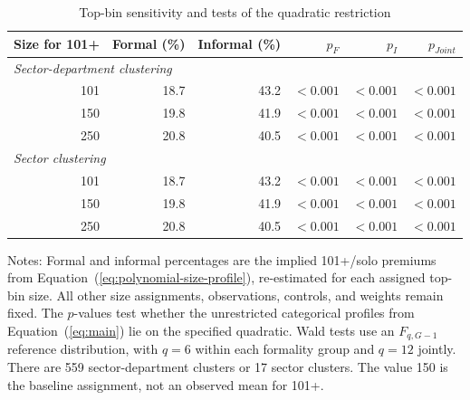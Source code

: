 \begin{table}[htbp]
  \centering
  \caption{Top-bin sensitivity and tests of the quadratic restriction}
  \label{tab:quadratic-preferred-sensitivity}
  \small
  \begin{tabular}{rrrrrr}
    \toprule
    Size for 101+ & Formal (\%) & Informal (\%) & $p_F$ & $p_I$ & $p_{Joint}$ \\[0.25em]
    \midrule
    \multicolumn{6}{l}{\textit{Sector-department clustering}} \\
    101 & 18.7 & 43.2 & $<0.001$ & $<0.001$ & $<0.001$ \\[0.25em]
    150 & 19.8 & 41.9 & $<0.001$ & $<0.001$ & $<0.001$ \\[0.25em]
    250 & 20.8 & 40.5 & $<0.001$ & $<0.001$ & $<0.001$ \\[0.25em]
    \midrule
    \multicolumn{6}{l}{\textit{Sector clustering}} \\
    101 & 18.7 & 43.2 & $<0.001$ & $<0.001$ & $<0.001$ \\[0.25em]
    150 & 19.8 & 41.9 & $<0.001$ & $<0.001$ & $<0.001$ \\[0.25em]
    250 & 20.8 & 40.5 & $<0.001$ & $<0.001$ & $<0.001$ \\[0.25em]
    \bottomrule
  \end{tabular}
  \vspace{0.3em}
  \begin{minipage}{0.95\textwidth}
  \footnotesize
  Notes: Formal and informal percentages are the implied 101+/solo premiums from Equation~(\ref{eq:polynomial-size-profile}), re-estimated for each assigned top-bin size. All other size assignments, observations, controls, and weights remain fixed. The $p$-values test whether the unrestricted categorical profiles from Equation~(\ref{eq:main}) lie on the specified quadratic. Wald tests use an $F_{q,G-1}$ reference distribution, with $q=6$ within each formality group and $q=12$ jointly. There are 559 sector-department clusters or 17 sector clusters. The value 150 is the baseline assignment, not an observed mean for 101+.
  \end{minipage}
\end{table}
